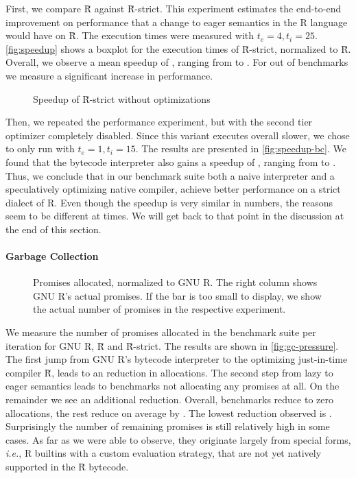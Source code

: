 \documentclass[review,nonacm,screen,acmsmall,anonymous=true]{acmart}
\renewcommand{\Rsh}{{\sf\u R}\xspace}
\newcommand{\Rshstrict}{{\sf\u R-strict}\xspace}
\newcommand{\ie}{\emph{i.e.},\xspace}
\begin{document}
First, we compare \Rsh against \Rshstrict. This experiment estimates the end-to-end
improvement on performance that a change to eager semantics in the R language
would have on \Rsh. The execution times were measured with $t_e = 4, t_i = 25$.
\autoref{fig:speedup} shows a boxplot for the execution times of \Rsh-strict,
normalized to \Rsh. Overall, we observe a mean speedup of
\speedupRshStrict, ranging from \speedupRshStrictMin to \speedupRshStrictMax.
For \speedupRshStrictSignificant out of \benchmarkSuiteSize benchmarks we measure a significant increase in performance.
%
\begin{figure}[h]
  \centering
  
  \caption{Speedup of \Rshstrict without optimizations}
  \label{fig:speedup-bc}
\end{figure}
%
Then, we repeated the performance experiment, but with the second tier
optimizer completely disabled. Since this variant executes overall \rshBCSlowdown
slower, we chose to only run with $t_e = 1, t_i = 15$.
The results are presented in \autoref{fig:speedup-bc}. We found that the bytecode
interpreter also gains a speedup of \speedupBCRshStrict, ranging from
\speedupBCRshStrictMin to \speedupBCRshStrictMax.
%
Thus, we conclude that in our benchmark suite both a naive interpreter and a speculatively
optimizing native compiler, achieve better performance on a strict dialect of R.
Even though the speedup is very similar in numbers, the reasons seem to be
different at times. We will get back to that point in the discussion at the end of
this section.

\paragraph{Garbage Collection}

\begin{figure}[h]
  \centering
  
  \caption{Promises allocated, normalized to GNU R. The right column shows GNU R's actual promises. If the bar is too small to display, we show the actual number of promises in the respective experiment.}
  \label{fig:gc-pressure}
\end{figure}

We measure the number of promises allocated in the
benchmark suite per iteration for GNU R, \Rsh and \Rsh-strict. The results are shown in
\autoref{fig:gc-pressure}. The first jump from GNU R's bytecode interpreter to
the optimizing just-in-time compiler \Rsh, leads to an \promiseAlocationReductionGnurRsh
reduction in allocations. The second step
from lazy to eager semantics leads to \promiseAlocationReductionRshStrictToZero
benchmarks not allocating any promises at all. On the remainder we see an additional
\promiseAlocationReductionRshStrict reduction.
Overall, \promiseAlocationReductionRshStrictToZero benchmarks reduce to zero
allocations, the rest reduce on average by \promiseAlocationReductionGnurRshStrict.
The lowest reduction observed is
\promiseAlocationReductionGnurRshStrictMin.
Surprisingly the number of remaining promises is
still relatively high in some cases. As far as we were able to observe, they
originate largely from special forms, \ie R builtins with a custom evaluation
strategy, that are not yet natively supported in the \Rsh bytecode.
\end{document}
